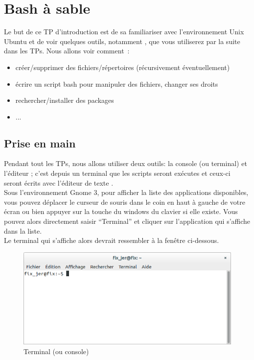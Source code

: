 \section{Bash à sable}

Le but de ce TP d'introduction est de sa familiariser avec l'environnement Unix Ubuntu et de voir quelques outils, notamment \bashcmd, que vous utiliserez par la suite dans les TPs. Nous allons voir comment~:
\begin{itemize}
\item créer/supprimer des fichiers/répertoires (récursivement éventuellement)
\item écrire un script bash pour manipuler des fichiers, changer ses droits
\item rechercher/installer des packages
\item ...
\end{itemize}

\subsection{Prise en main}

Pendant tout les TPs, nous allons utiliser deux outils: la console (ou terminal) et l'éditeur \emacs; c'est depuis un terminal que les scripts seront exécutes et ceux-ci seront écrits avec l'éditeur de texte \emacs. \\

Sous l'environnement Gnome 3, pour afficher la liste des applications disponibles, vous pouvez déplacer le curseur de souris dans le coin en haut à gauche de votre écran ou bien appuyer sur la touche du windows du clavier si elle existe. Vous pouvez alors directement saisir ``Terminal'' et cliquer sur l'application qui s'affiche dans la liste.\\

Le terminal qui s'affiche alors devrait ressembler à la fenêtre ci-dessous.

\begin{figure}[htbp]
\includegraphics[width=0.5\columnwidth]{Figs/terminal.png}
\caption{Terminal (ou console)}
\end{figure}

